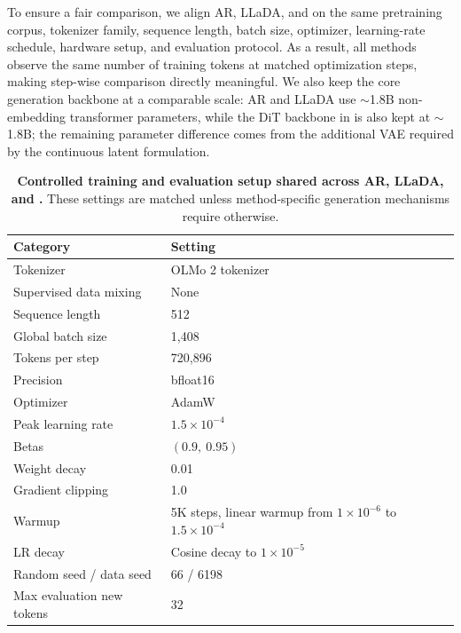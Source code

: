 To ensure a fair comparison, we align AR, LLaDA, and \method on the same pretraining corpus, tokenizer family, sequence length, batch size, optimizer, learning-rate schedule, hardware setup, and evaluation protocol. As a result, all methods observe the same number of training tokens at matched optimization steps, making step-wise comparison directly meaningful. We also keep the core generation backbone at a comparable scale: AR and LLaDA use $\sim$1.8B non-embedding transformer parameters, while the DiT backbone in \method is also kept at $\sim$1.8B; the remaining parameter difference comes from the additional VAE required by the continuous latent formulation.

\begin{table}[t]
    \centering
    \caption{\textbf{Controlled training and evaluation setup shared across AR, LLaDA, and \method.} These settings are matched unless method-specific generation mechanisms require otherwise.}
    \label{tab:setup_shared}
    \small
    \setlength{\tabcolsep}{7pt}
    \renewcommand{\arraystretch}{1.12}
    \begin{tabular*}{\textwidth}{@{\extracolsep{\fill}}ll}
        \toprule
        \textbf{Category} & \textbf{Setting} \\
        \midrule
        Tokenizer & OLMo 2 tokenizer \\
        Supervised data mixing & None \\
        Sequence length & 512 \\

        Global batch size & 1,408 \\
        Tokens per step & 720,896 \\

        Precision & bfloat16 \\
        Optimizer & AdamW \\
        Peak learning rate & $1.5 \times 10^{-4}$ \\
        Betas & $(0.9,\ 0.95)$ \\
        Weight decay & 0.01 \\
        Gradient clipping & 1.0 \\
        Warmup & 5K steps, linear warmup from $1\times10^{-6}$ to $1.5\times10^{-4}$ \\
        LR decay & Cosine decay to $1\times10^{-5}$ \\

        Random seed / data seed & 66 / 6198 \\

        Max evaluation new tokens & 32 \\

        \bottomrule
    \end{tabular*}
\end{table}

